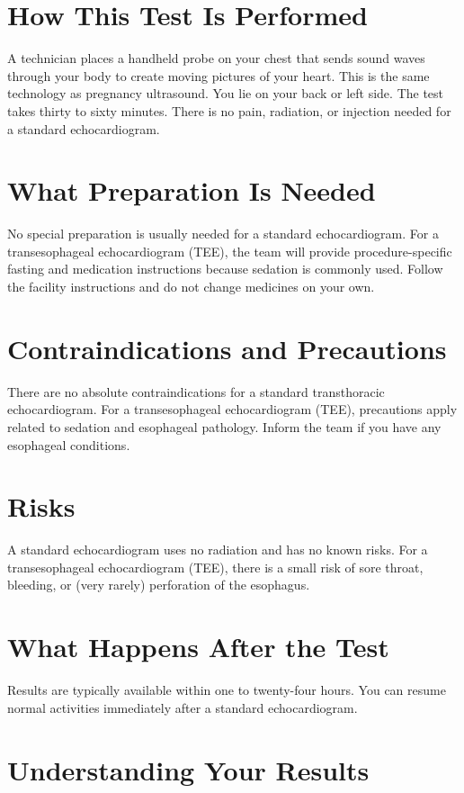 \section*{How This Test Is Performed}
A technician places a handheld probe on your chest that sends sound waves through your body to create moving pictures of your heart. This is the same technology as pregnancy ultrasound. You lie on your back or left side. The test takes thirty to sixty minutes. There is no pain, radiation, or injection needed for a standard echocardiogram.

\section*{What Preparation Is Needed}
No special preparation is usually needed for a standard echocardiogram. For a transesophageal echocardiogram (TEE), the team will provide procedure-specific fasting and medication instructions because sedation is commonly used. Follow the facility instructions and do not change medicines on your own.

\section*{Contraindications and Precautions}
There are no absolute contraindications for a standard transthoracic echocardiogram. For a transesophageal echocardiogram (TEE), precautions apply related to sedation and esophageal pathology. Inform the team if you have any esophageal conditions.

\section*{Risks}
A standard echocardiogram uses no radiation and has no known risks. For a transesophageal echocardiogram (TEE), there is a small risk of sore throat, bleeding, or (very rarely) perforation of the esophagus.

\section*{What Happens After the Test}
Results are typically available within one to twenty-four hours. You can resume normal activities immediately after a standard echocardiogram.

\section*{Understanding Your Results}

